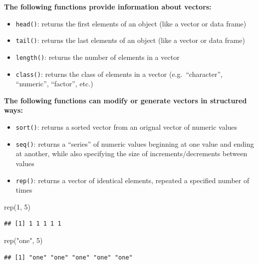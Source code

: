 \documentclass[
]{book}
\newenvironment{Shaded}{\begin{snugshade}}{\end{snugshade}}
\newcommand{\DecValTok}[1]{\textcolor[rgb]{0.00,0.00,0.81}{#1}}
\newcommand{\FunctionTok}[1]{\textcolor[rgb]{0.00,0.00,0.00}{#1}}
\newcommand{\NormalTok}[1]{#1}
\newcommand{\StringTok}[1]{\textcolor[rgb]{0.31,0.60,0.02}{#1}}
\begin{document}
\textbf{The following functions provide information about vectors:}

\begin{itemize}
\item
  \texttt{head()}: returns the first elements of an object (like a vector or data frame)
\item
  \texttt{tail()}: returns the last elements of an object (like a vector or data frame)
\item
  \texttt{length()}: returns the number of elements in a vector
\item
  \texttt{class()}: returns the class of elements in a vector (e.g.~``character'', ``numeric'', ``factor'', etc.)
\end{itemize}

\textbf{The following functions can modify or generate vectors in structured ways:}

\begin{itemize}
\item
  \texttt{sort()}: returns a sorted vector from an orignal vector of numeric values
\item
  \texttt{seq()}: returns a ``series'' of numeric values beginning at one value and ending at another, while also specifying the size of increments/decrements between values
\item
  \texttt{rep()}: returns a vector of identical elements, repeated a specified number of times
\end{itemize}

\begin{Shaded}
\begin{Highlighting}[]
\FunctionTok{rep}\NormalTok{(}\DecValTok{1}\NormalTok{, }\DecValTok{5}\NormalTok{)}
\end{Highlighting}
\end{Shaded}

\begin{verbatim}
## [1] 1 1 1 1 1
\end{verbatim}

\begin{Shaded}
\begin{Highlighting}[]
\FunctionTok{rep}\NormalTok{(}\StringTok{"one"}\NormalTok{, }\DecValTok{5}\NormalTok{)}
\end{Highlighting}
\end{Shaded}

\begin{verbatim}
## [1] "one" "one" "one" "one" "one"
\end{verbatim}
\end{document}
